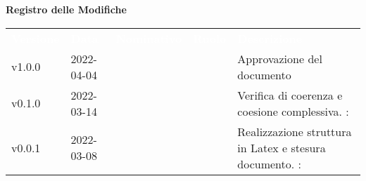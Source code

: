 

{\LARGE{\textbf{Registro delle Modifiche}}} \\
\begin{table}[!htbp]
\renewcommand{\arraystretch}{1.5}
\begin{tabular}{ m{}<{\centering}  m{}<{\centering}  m{}<{\centering}  m{}<{\centering}  m{}<{\centering} }
	\rowcolor{darkblue}
	\textcolor{white}{\textbf{Versione}} &\textcolor{white}{\textbf{Data}}& \textcolor{white}{\textbf{Nominativo}} & \textcolor{white}{\textbf{Ruolo}}&\textcolor{white}{\textbf{Descrizione}}\\ 
	v1.0.0& 2022-04-04 & \MG & \RE & Approvazione del documento \\

	v0.1.0& 2022-03-14 & \PV & \AN & Verifica di coerenza e coesione complessiva. \VE: \textit{\GC}\\

	v0.0.1& 2022-03-08 & \PV & \AN & Realizzazione struttura in Latex e stesura documento. \VE: \textit{\GC}\\

\end{tabular}
\end{table}

\pagebreak